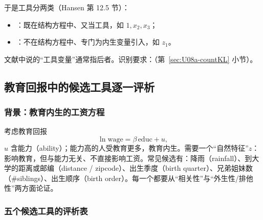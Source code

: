 于是工具分两类（Hansen 第 12.5 节）：
\begin{itemize}
  \item {}：既在结构方程中、又当工具，如 $1,x_2,x_3$；
  \item {}：不在结构方程中、专门为内生变量引入，如 $z_1$。
\end{itemize}
文献中说的“工具变量”通常指后者。识别要求：（第~\ref{sec:U08a-countKL} 小节）。

\subsection{教育回报中的候选工具逐一评析}\label{sec:U08a-cand}

\subsubsection{背景：教育内生的工资方程}

考虑教育回报
\[
\ln \text{wage}=\beta\,\text{educ}+u ,
\]
$u$ 含能力（ability）；能力高的人受教育更多，教育内生。需要一个“自然特征”$z$：影响教育，但与能力无关、不直接影响工资。常见候选有：降雨（rainfall）、到大学的距离或邮编（distance / zipcode）、出生季度（birth quarter）、兄弟姐妹数（\#siblings）、出生顺序（birth order）。每一个都要从“相关性”与“外生性/排他性”两方面论证。

\subsubsection{五个候选工具的评析表}

